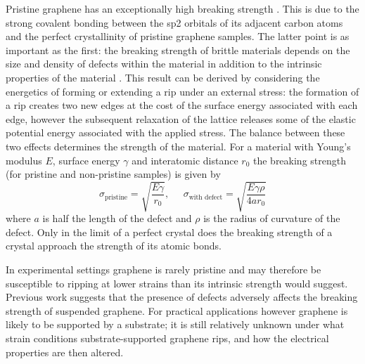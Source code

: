 \documentclass[edeposit,fullpage,draftthesis]{uiucthesis2009}
\begin{document}
        Pristine graphene has an exceptionally high breaking strength \cite{Lee2008}.
        This is due to the strong covalent bonding between the sp2 orbitals of its
        adjacent carbon atoms and the perfect crystallinity of pristine graphene samples.
        The latter point is as important as the first: the breaking strength of brittle
        materials depends on the size and density of defects within the material 
        in addition to the intrinsic properties of the material \cite{griffith1921phenomena}.
        This result can be derived by considering the energetics of forming or extending
        a rip under an external stress: the formation of a rip creates two new edges at the cost of the surface energy
        associated with each edge, however the subsequent relaxation of the lattice releases some
        of the elastic potential energy associated with the applied stress. The balance between these
        two effects determines the strength of the material.
        For a material with Young's modulus $E$, surface energy $\gamma$ and interatomic distance $r_0$
        the breaking strength (for pristine and non-pristine samples) is given by
        \begin{equation}
            \sigma_\text{pristine} = \sqrt{\frac{E \gamma}{r_0}}, \;\;\;\;\;
            \sigma_\text{with defect} = \sqrt{\frac{E \gamma \rho}{4 a r_0}}
        \end{equation}
        where $a$ is half the length of the defect and $\rho$ is the radius of curvature of the defect.
        Only in the limit of a perfect crystal does the breaking strength of a crystal approach the strength
        of its atomic bonds. 
        
        In experimental settings graphene is rarely pristine and may therefore
        be susceptible to ripping at lower strains than its intrinsic strength would suggest. 
        Previous work suggests that the presence of defects 
        \cite{Kim2012, zandiatashbar2014effect, huang2011grains, lee2013high} 
        adversely affects the breaking strength of suspended graphene. 
        For practical applications however graphene is likely to be supported by a substrate;
        it is still relatively unknown under what strain conditions substrate-supported
        graphene rips, and how the electrical properties are then altered.
        
\end{document}
